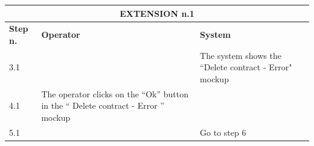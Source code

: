 {{{			\begin{table}[h]
			\begin{tabular}{|p{2cm}|p{6cm}|p{6cm}|}
			\hline
				\multicolumn{3}{|c|}{EXTENSION n.1} \\
			\hline
				\vspace{1mm} \bfseries{Step n.} \vspace{1mm} & 
				\vspace{1mm} \bfseries{Operator} \vspace{1mm} & 
				\vspace{1mm} \bfseries{System} \vspace{1mm}\\
			\hline
				\vspace{1mm} 3.1 \vspace{1mm} &
				\vspace{1mm} \vspace{1mm} & 
				\vspace{1mm} The system shows the “Delete contract - Error" mockup \vspace{1mm} \\
			\hline
				\vspace{1mm} 4.1 \vspace{1mm} &
				\vspace{1mm} The operator clicks on the “Ok”  button  in the “ Delete contract - Error ”  mockup\vspace{1mm} & 
				\vspace{1mm} \vspace{1mm} \\
			\hline
				\vspace{1mm} 5.1 \vspace{1mm} &
				\vspace{1mm} \vspace{1mm} & 
				\vspace{1mm} Go to step 6 \vspace{1mm} \\
			\hline
			\end{tabular}
			\end{table}

}}}
